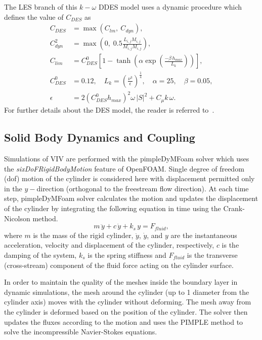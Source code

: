 The LES branch of this $k-\omega$ DDES model uses a dynamic procedure which
defines the value of $C_{DES}$ as
%
\begin{align}
  C_{DES}   & =  \max( C_{lm},~C_{dyn} ), \nonumber \\
  C_{dyn}^2 & = \max \left( 0,\; 0.5 \frac{L_{i,j} M_{i,j}}{M_{i,j} M_{i,j}}\right), \nonumber \\
  C_{lim}   &=C_{DES}^0 \left[1-\tanh \left(\alpha \exp \left(\frac{-\beta \, h_{max}}{L_k}\right)\right)\right],\\
  C_{DES}^0 &=0.12, \quad   L_k=\left(\frac{\nu^3}{\epsilon}\right)^{\frac{1}{4}},  \quad  \alpha=25,  \quad  \beta=0.05, \nonumber \\
  \epsilon  &= 2 \left(C_{DES}^0 h_{max} \right)^2 \omega\,|S|^2+C_\mu k\,\omega. \nonumber
\end{align}  
%
For further details about the DES model, the reader is referred
to~\cite{yin2015dynamic}.

\subsection{Solid Body Dynamics and Coupling}
\label{sec:coupling}
%
Simulations of VIV are performed with the pimpleDyMFoam solver which uses the
{\em sixDoFRigidBodyMotion} feature of OpenFOAM. Single degree of freedom (dof)
motion of the cylinder is considered here with displacement permitted only in
the $y-$direction (orthogonal to the freestream flow direction). At each time
step, pimpleDyMFoam solver calculates the motion and updates the displacement
of the cylinder by integrating the following equation in time using the
Crank-Nicolson method.
%
\begin{equation}
  m\,\ddot{y} + c\,\dot{y} + k_s \,y = F_{fluid},
  \label{eq:solidBodyDynamics}
\end{equation}
%
where $m$ is the mass of the rigid cylinder, $\ddot{y}$, $\dot{y}$, and $y$ are the
instantaneous acceleration, velocity and displacement of the cylinder,
respectively, $c$ is the damping of the system, $k_s$ is the spring stiffness and
$F_{fluid}$ is the transverse (cross-stream) component of the fluid force
acting on the cylinder surface.

In order to maintain the quality of the meshes inside the boundary layer in
dynamic simulations, the mesh around the cylinder (up to 1 diameter from the
cylinder axis) moves with the cylinder without deforming. The mesh away from
the cylinder is deformed based on the position of the cylinder. The solver then
updates the fluxes according to the motion and uses the PIMPLE method to solve
the incompressible Navier-Stokes equations.


